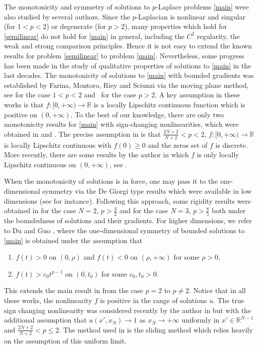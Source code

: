 \documentclass[reqno]{amsart}
\theoremstyle{plain}
\theoremstyle{definition}
\theoremstyle{remark}
\begin{document}
	The monotonicity and symmetry of solutions to $p$-Laplace problems \eqref{main} were also studied by several authors. Since the $p$-Laplacian is nonlinear and singular (for $1<p<2$) or degenerate (for $p>2$), many properties which hold for \eqref{semilinear} do not hold for \eqref{main} in general, including the $C^2$ regularity, the weak and strong comparison principles. Hence it is not easy to extend the known results for problem \eqref{semilinear} to problem \eqref{main}. Nevertheless, some progress has been made in the study of qualitative properties of solutions to \eqref{main} in the last decades.	
	The monotonicity of solutions to \eqref{main} with bounded gradients was established by Farina, Montoro, Riey and Sciunzi via the moving plane method, see \cite{MR3303939,MR2886112} for the case $1 < p < 2$ and \cite{MR3752525,MR3118616}  for the case $p > 2$. A key assumption in these works is that $f:[0,+\infty)\to\mathbb{R}$ is a locally Lipschitz continuous function which is positive on $(0,+\infty)$. To the best of our knowledge, there are only two monotonicity results for \eqref{main} with sign-changing nonlinearities, which were obtained in \cite{MR4439897} and \cite{MR3371569}. The precise assumption in \cite{MR4439897} is that $\frac{2N+2}{N+2}<p<2$, $f:[0,+\infty)\to\mathbb{R}$ is locally Lipschitz continuous with $f(0)\ge0$ and the zeros set of $f$ is discrete. More recently, there are some results by the author in which $f$ is only locally Lipschitz continuous on $(0,+\infty)$, see \cite{10.1007/s11118-024-10157-1,2024arXiv240900365L}.
	
	When the monotonicity of solutions is in force, one may pass it to the one-dimensional symmetry via the De Giorgi type results which were available in low dimensions (see \cite{MR2483642} for instance). Following this approach, some rigidity results were obtained in \cite{MR2654242} for the case $N=2$, $p>\frac{3}{2}$ and \cite{MR3118616,MR2886112} for the case $N=3$, $p>\frac{8}{5}$ both under the boundedness of solutions and their gradients. For higher dimensions, we refer to Du and Guo \cite{MR2056284}, where the one-dimensional symmetry of bounded solutions to \eqref{main} is obtained under the assumption that
	\begin{enumerate}
		\item[(i)] $f(t)>0$ on $(0,\rho)$ and $f(t)<0$ on $(\rho,+\infty)$ for some $\rho>0$,
		\item[(ii)] $f(t)>c_0 t^{p-1}$ on $(0,t_0)$ for some $c_0,t_0>0$.
	\end{enumerate}
	This extends the main result in \cite{MR1470317} from the case $p=2$ to $p\ne2$.
	Notice that in all these works, the nonlinearity $f$ is positive in the range of solutions $u$.
	The true sign changing nonlinearity was considered recently by the author in \cite{MR4771444} but with the additional assumption that $u(x',x_N)\to1$ as $x_N\to+\infty$ uniformly in $x'\in\mathbb{R}^{N-1}$ and $\frac{2N+2}{N+2}<p\le2$. The method used in \cite{MR4771444} is the sliding method which relies heavily on the assumption of this uniform limit.
	
\end{document}
